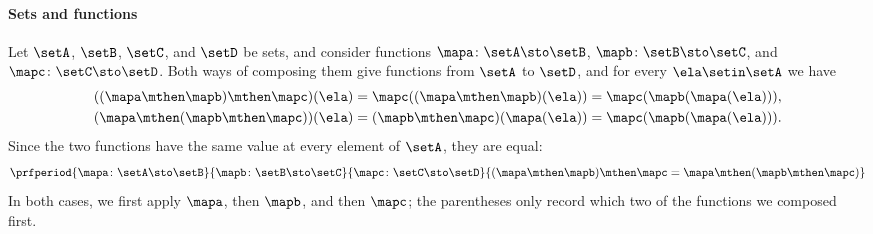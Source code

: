 \paragraph{Sets and functions}
Let $\setA$, $\setB$, $\setC$, and $\setD$ be sets, and consider functions $\mapa \colon \setA \sto \setB$, $\mapb \colon \setB \sto \setC$, and $\mapc \colon \setC \sto \setD$. Both ways of composing them give functions from $\setA$ to $\setD$, and for every $\ela \setin \setA$ we have
\begin{equation}
    \begin{aligned}
        ((\mapa \mthen \mapb) \mthen \mapc)(\ela) & = \mapc((\mapa \mthen \mapb)(\ela)) = \mapc(\mapb(\mapa(\ela))), \\
        (\mapa \mthen (\mapb \mthen \mapc))(\ela) & = (\mapb \mthen \mapc)(\mapa(\ela)) = \mapc(\mapb(\mapa(\ela))).
    \end{aligned}
\end{equation}
Since the two functions have the same value at every element of $\setA$, they are equal:
\begin{equation}
    \label{eq:assoc-functions}
    \prfperiod{
        \mapa \colon \setA \sto \setB
    }{
        \mapb \colon \setB \sto \setC
    }{
        \mapc \colon \setC \sto \setD
    }{
        (\mapa \mthen \mapb) \mthen \mapc = \mapa \mthen (\mapb \mthen \mapc)
    }
\end{equation}
In both cases, we first apply $\mapa$, then $\mapb$, and then $\mapc$; the parentheses only record which two of the functions we composed first.

